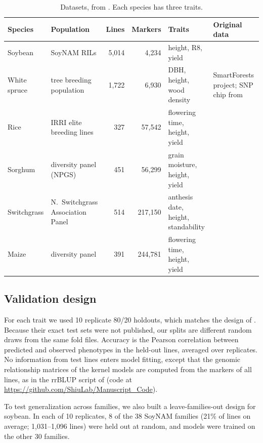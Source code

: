 \documentclass[11pt]{article}
\begin{document}
\begin{table}[tbp]
\centering
\caption{Datasets, from \citet{azodi2019}. Each species has three traits.}
\label{tab:data}
\footnotesize
\setlength{\tabcolsep}{4pt}
\begin{tabular}{@{}p{1.9cm}p{3.0cm}rrp{3.0cm}p{3.6cm}@{}}
\toprule
Species & Population & Lines & Markers & Traits & Original data \\
\midrule
Soybean & SoyNAM RILs & 5,014 & 4,234 & height, R8, yield & \citet{xavier2016} \\
White spruce & tree breeding population & 1,722 & 6,930 & DBH, height, wood density & SmartForests project; SNP chip from \citet{beaulieu2014} \\
Rice & IRRI elite breeding lines & 327 & 57,542 & flowering time, height, yield & \citet{spindel2015} \\
Sorghum & diversity panel (NPGS) & 451 & 56,299 & grain moisture, height, yield & \citet{fernandes2018} \\
Switchgrass & N.\ Switchgrass Association Panel & 514 & 217,150 & anthesis date, height, standability & \citet{lipka2014,evans2015,evans2018} \\
Maize & diversity panel & 391 & 244,781 & flowering time, height, yield & \citet{hansey2011,hirsch2014} \\
\bottomrule
\end{tabular}
\end{table}

\subsection{Validation design}

For each trait we used 10 replicate 80/20 holdouts, which matches the design of \citet{azodi2019}. Because their exact test sets were not published, our splits are different random draws from the same fold files. Accuracy is the Pearson correlation between predicted and observed phenotypes in the held-out lines, averaged over replicates. No information from test lines enters model fitting, except that the genomic relationship matrices of the kernel models are computed from the markers of all lines, as in the rrBLUP script of \citet{azodi2019} (code at \url{https://github.com/ShiuLab/Manuscript_Code}).

To test generalization across families, we also built a leave-families-out design for soybean. In each of 10 replicates, 8 of the 38 SoyNAM families (21\% of lines on average; 1,031--1,096 lines) were held out at random, and models were trained on the other 30 families.
\end{document}
